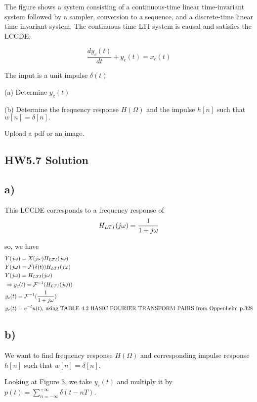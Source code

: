 \documentclass[11pt, fleqn]{article}
\begin{document}
The figure shows a system consisting of a continuous-time linear time-invariant system followed by a sampler, conversion to a sequence, and a discrete-time linear time-invariant system. The continuous-time LTI system is causal and satisfies the LCCDE:

$$ \frac{dy_c(t)}{dt} + y_c(t) = x_c(t) $$


The input
is a unit impulse $\delta (t)$ 

(a) Determine $ y_c(t) $ 

(b) Determine the frequency response $H(\Omega)$ and the impulse $h[n]$ such that $w[n]=\delta [n].$ 

Upload a pdf or an image.

\subsection*{HW5.7 Solution}

\subsection*{a)}

This LCCDE corresponds to a frequency response of 
$$ 
    H_{LTI}(j\omega) = \frac{1}{1 + j\omega}
$$

so, we have 
\begin{align*}
    &Y(j\omega) = X(j\omega) H_{LTI}(j\omega)  \\
    &Y(j\omega) = \mathcal{F}(\delta(t))H_{LTI}(j\omega)  \\
    &Y(j\omega) = H_{LTI}(j\omega) \\
    &\Rightarrow y_c(t) = \mathcal{F}^{-1}(H_{LTI}(j \omega)) \\ 
    &y_c(t) = \mathcal{F}^{-1}( \frac{1}{1 + j\omega}) \\ 
    &y_c(t) = e^{-t}u(t) \text{, using TABLE 4.2 BASIC FOURIER TRANSFORM PAIRS from Oppenheim p.328}
\end{align*}

\subsection*{b)}

We want to find frequency response $H(\Omega)$ and corresponding impulse response $h[n]$ such that $w[n]=\delta [n]$.

Looking at Figure 3, we take $ y_c(t) $ and multiply it by $p(t) = \sum_{n=-\infty}^{+\infty} \delta(t - nT) $.
\end{document}
